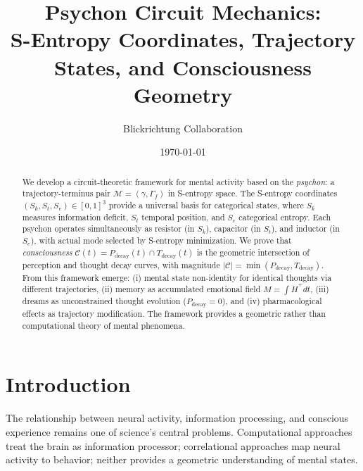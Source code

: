 \documentclass[twocolumn,amsmath,amssymb,aps,prl,superscriptaddress]{revtex4-2}
\newcommand{\Sk}{S_k}
\newcommand{\St}{S_t}
\newcommand{\Se}{S_e}
\newcommand{\Mstate}{\mathcal{M}}
\newcommand{\Ccat}{\mathcal{C}}
\newcommand{\Pdecay}{P_{\text{decay}}}
\newcommand{\Tdecay}{T_{\text{decay}}}
\newcommand{\Hfield}{H}
\newcommand{\Gstate}{\Gamma}
\newcommand{\traj}{\gamma}
\begin{document}
\title{Psychon Circuit Mechanics: \\
S-Entropy Coordinates, Trajectory States, and Consciousness Geometry}

\author{Blickrichtung Collaboration}

\date{\today}

\begin{abstract}
We develop a circuit-theoretic framework for mental activity based on the \emph{psychon}: a trajectory-terminus pair $\Mstate = (\traj, \Gstate_f)$ in S-entropy space. The S-entropy coordinates $(\Sk, \St, \Se) \in [0,1]^3$ provide a universal basis for categorical states, where $\Sk$ measures information deficit, $\St$ temporal position, and $\Se$ categorical entropy. Each psychon operates simultaneously as resistor (in $\Sk$), capacitor (in $\St$), and inductor (in $\Se$), with actual mode selected by S-entropy minimization. We prove that \emph{consciousness} $\Ccat(t) = \Pdecay(t) \cap \Tdecay(t)$ is the geometric intersection of perception and thought decay curves, with magnitude $|\Ccat| = \min(\Pdecay, \Tdecay)$. From this framework emerge: (i) mental state non-identity for identical thoughts via different trajectories, (ii) memory as accumulated emotional field $M = \int \dot{\Hfield}^+ dt$, (iii) dreams as unconstrained thought evolution ($\Pdecay = 0$), and (iv) pharmacological effects as trajectory modification. The framework provides a geometric rather than computational theory of mental phenomena.
\end{abstract}

\maketitle

\section{Introduction}

The relationship between neural activity, information processing, and conscious experience remains one of science's central problems. Computational approaches treat the brain as information processor; correlational approaches map neural activity to behavior; neither provides a geometric understanding of mental states.
\end{document}
